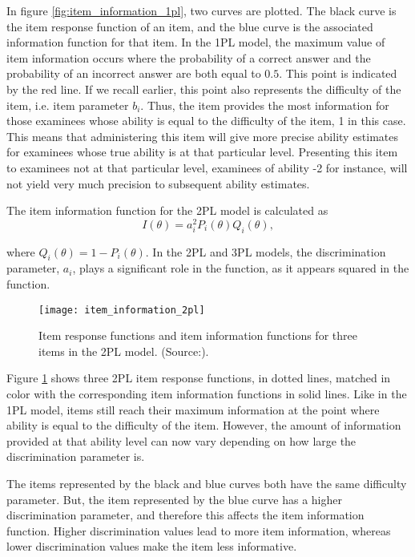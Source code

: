 In figure \ref{fig:item_information_1pl}, two curves are plotted. The black curve is the item response function of an item, and the blue curve is the associated information function for that item. In the 1PL model, the maximum value of item information occurs where the probability of a correct answer and the probability of an incorrect answer are both equal to $0.5$. This point is indicated by the red line. If we recall earlier, this point also represents the difficulty of the item, i.e. item parameter $b_i$. Thus, the item provides the most information for those examinees whose ability is equal to the difficulty of the item, 1 in this case. This means that administering this item will give more precise ability estimates for examinees whose true ability is at that particular level. Presenting this item to examinees not at that particular level, examinees of ability -2 for instance, will not yield very much precision to subsequent ability estimates. \newline

The item information function for the 2PL model is calculated as
$$I(\theta) = a_i^2 P_i(\theta)Q_i(\theta),$$

where $Q_i(\theta) = 1-P_i(\theta)$. In the 2PL and 3PL models, the discrimination parameter, $a_i$, plays a significant role in the function, as it appears squared in the function.

\begin{figure}[H]
\centering
\texttt{[image: item\_information\_2pl]}
\caption{Item response functions and item information
functions for three items in the 2PL model. (Source:\cite{Visual-IRT}).}
\label{fig:item_information_2pl}
\end{figure}

Figure \ref{fig:item_information_2pl} shows three 2PL item response functions, in dotted lines, matched in color with the corresponding item information functions in solid lines. Like in the 1PL model, items still reach their maximum information at the point where ability is equal to the difficulty of the item. However, the amount of information provided at that ability level can now vary depending on how large the discrimination parameter is.\newline

The items represented by the black and blue curves both have the same difficulty parameter. But, the item represented by the blue curve has a higher discrimination parameter, and therefore this affects the item information function. Higher discrimination values lead to more item information, whereas lower discrimination values make the item less informative. \newline

